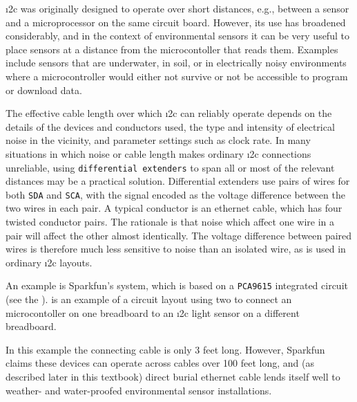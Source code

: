 \i2c was originally designed to operate over short distances, e.g., between a sensor and a microprocessor on the same circuit board.
However, its use has broadened considerably, and in the context of environmental sensors it can be very useful to place sensors at a distance from the microcontoller that reads them.
Examples include sensors that are underwater, in soil, or in electrically noisy environments where a microcontroller would either not survive or not be accessible to program or download data.

The effective cable length over which \i2c can reliably operate depends on the details of the devices and conductors used, the type and intensity of electrical noise in the vicinity, and parameter settings such as clock rate.
In many situations in which noise or cable length makes ordinary \i2c connections unreliable, using \texttt{differential extenders} to span all or most of the relevant distances may be a practical solution.
Differential extenders use pairs of wires for both \texttt{SDA} and \texttt{SCA}, with the signal encoded as the voltage difference between the two wires in each pair.
A typical conductor is an ethernet cable, which has four twisted conductor pairs.
The rationale is that noise which affect one wire in a pair will affect the other almost identically.
The voltage difference between paired wires is therefore much less sensitive to noise than an isolated wire, as is used in ordinary \i2c layouts.

An example is Sparkfun's  system, which is based on a \texttt{PCA9615} integrated circuit (see the ).
 is an example of a circuit layout using two  to connect an  microcontoller on one breadboard to an \i2c light sensor on a different breadboard.

In this example the connecting cable is only 3 feet long.
However, Sparkfun claims these devices can operate across cables over 100 feet long, and (as described later in this textbook) direct burial ethernet cable lends itself well to weather- and water-proofed environmental sensor installations.

